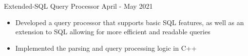 \documentclass{article}
\begin{document}

\noindent
Extended-SQL Query Processor
\hfill
April - May 2021\\
\vspace{-1em}
\begin{itemize}
\item Developed a query processor that supports basic SQL features, as well as an extension to SQL allowing for more efficient and readable queries
\item Implemented the parsing and query processing logic in C++
\end{itemize}




\noindent
\end{document}
